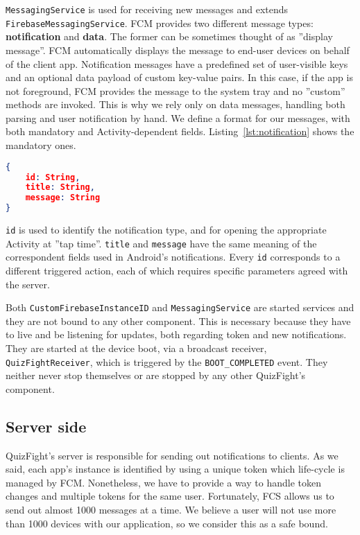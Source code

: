 \texttt{MessagingService} is used for receiving new messages and extends \\\texttt{FirebaseMessagingService}. FCM provides two different message types: \textbf{notification} and \textbf{data}. The former can be sometimes thought of as ''display message''. FCM automatically displays the message to end-user devices on behalf of the client app. Notification messages have a predefined set of user-visible keys and an optional data payload of custom key-value pairs. In this case, if the app is not foreground, FCM provides the message to the system tray and no ''custom'' methods are invoked. This is why we rely only on data messages, handling both parsing and user notification by hand. We define a format for our messages, with both mandatory and Activity-dependent fields. Listing~\ref{lst:notification} shows the mandatory ones.
\begin{lstlisting}[language=json, caption={Mandatory fields for a notification}, label={lst:notification}]
{
	id: String,
	title: String,
	message: String
}
\end{lstlisting}
\texttt{id} is used to identify the notification type, and for opening the appropriate Activity at ''tap time''. \texttt{title} and \texttt{message} have the same meaning of the correspondent fields used in Android's notifications. Every \texttt{id} corresponds to a different triggered action, each of which requires specific parameters agreed with the server.

Both \texttt{CustomFirebaseInstanceID} and \texttt{MessagingService} are started services and they are not bound to any other component. This is necessary because they have to live and be listening for updates, both regarding token and new notifications. They are started at the device boot, via a broadcast receiver, \texttt{QuizFightReceiver}, which is triggered by the \texttt{BOOT\_COMPLETED} event. They neither never stop themselves or are stopped by any other QuizFight's component. 

\subsection{Server side}
QuizFight's server is responsible for sending out notifications to clients. As we said, each app's instance is identified by using a unique token which life-cycle is managed by FCM. Nonetheless, we have to provide a way to handle token changes and multiple tokens for the same user. Fortunately, FCS allows us to send out almost 1000 messages at a time. We believe a user will not use more than 1000 devices with our application, so we consider this as a safe bound.

